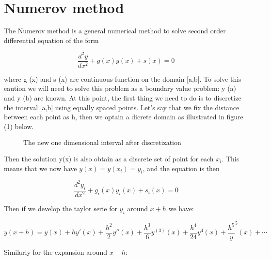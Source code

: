 \documentclass[12pt]{article}
\begin{document}
\tableofcontents
\pagebreak


\section{Numerov method}
The Numerov method is a general numerical method to solve second order differential equation of the form

\begin{equation}
\frac{d^2y}{dx^2}+g(x)y(x)+s(x) = 0
\label{NumerovDifEquation}
\end{equation}

where g (x) and s (x) are continuous function on the domain [a,b]. To solve this eaution we will need to solve this problem as a boundary value problem: y (a) and y (b) are known. At this point,
the first thing we need to do is to discretize the interval [a,b] using equally spaced points. Let's say that we fix the distance between each point as h, then we optain a dicrete domain as 
illustrated in figure (1) below.

\begin{figure}[h!]
\centering
\label{interval}
\caption{The new one dimensional interval after discretization}
\end{figure} 

Then the solution y(x) is also obtain as a discrete set of point for each $x_i$. This means that we now have $y(x)=y(x_i)=y_i$, and the equation is then 

\begin{equation}
\frac{d^2y_i}{dx^2} +g_i(x)y_i(x)+s_i(x) = 0
\label{NumerovEqDiscrete}
\end{equation}

Then if we develop the taylor serie for $y_i$ around $x+h$ we have:

\begin{equation}
y(x+h) = y(x) + hy'(x) + \frac{h^2}{2}y''(x) + \frac{h^3}{6}y^{(3)}(x) + \frac{h^4}{24}y^{4}(x) + \frac{h^5}y^{5}(x) + \cdots
\label{TaylorPlush}
\end{equation}

Similarly for the expansion around $x-h$:
\end{document}
